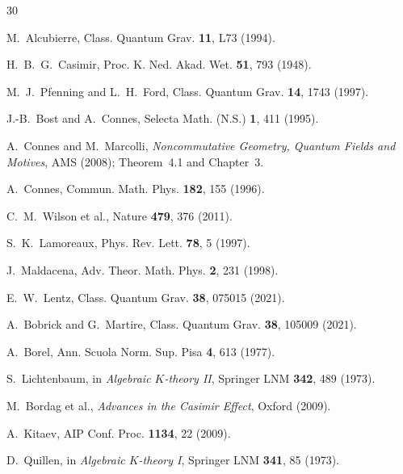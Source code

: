 \documentclass[11pt,a4paper]{article}
\begin{document}
\begin{thebibliography}{30}

M.~Alcubierre, Class. Quantum Grav. \textbf{11}, L73 (1994).

H.~B.~G.~Casimir, Proc. K. Ned. Akad. Wet. \textbf{51}, 793 (1948).

M.~J.~Pfenning and L.~H.~Ford, Class. Quantum Grav. \textbf{14}, 1743 (1997).

J.-B.~Bost and A.~Connes, Selecta Math. (N.S.) \textbf{1}, 411 (1995).

A.~Connes and M.~Marcolli, \emph{Noncommutative Geometry, Quantum Fields
and Motives}, AMS (2008); Theorem~4.1 and Chapter~3.

A.~Connes, Commun. Math. Phys. \textbf{182}, 155 (1996).

C.~M.~Wilson et al., Nature \textbf{479}, 376 (2011).

S.~K.~Lamoreaux, Phys. Rev. Lett. \textbf{78}, 5 (1997).

J.~Maldacena, Adv. Theor. Math. Phys. \textbf{2}, 231 (1998).

E.~W.~Lentz, Class. Quantum Grav. \textbf{38}, 075015 (2021).

A.~Bobrick and G.~Martire, Class. Quantum Grav. \textbf{38}, 105009 (2021).

A.~Borel, Ann. Scuola Norm. Sup. Pisa \textbf{4}, 613 (1977).

S.~Lichtenbaum, in \emph{Algebraic $K$-theory II}, Springer LNM \textbf{342}, 489 (1973).

M.~Bordag et al., \emph{Advances in the Casimir Effect}, Oxford (2009).

A.~Kitaev, AIP Conf. Proc. \textbf{1134}, 22 (2009).

D.~Quillen, in \emph{Algebraic $K$-theory I}, Springer LNM \textbf{341}, 85 (1973).

\end{thebibliography}
\end{document}
